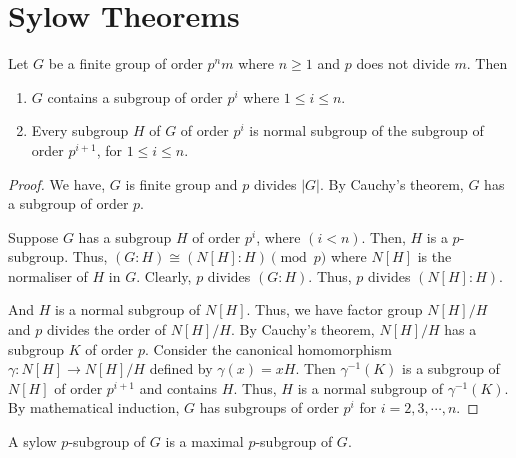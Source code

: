 \section{Sylow Theorems}
\begin{theorem}
	Let $G$ be a finite group of order $p^n m$ where $n \ge 1$ and $p$ does not divide $m$. Then
	\begin{enumerate}
		\item $G$ contains a subgroup of order $p^i$ where $1 \le i \le n$.
		\item Every subgroup $H$ of $G$ of order $p^i$ is normal subgroup of the subgroup of order $p^{i+1}$, for $1 \le i \le n$.
	\end{enumerate}
\end{theorem}
\begin{proof}
	We have, $G$ is finite group and $p$ divides $|G|$.
	By Cauchy's theorem, $G$ has a subgroup of order $p$.

	Suppose $G$ has a subgroup $H$ of order $p^i$, where $(i < n)$.
	Then, $H$ is a $p$-subgroup.
	Thus, $(G:H) \cong (N[H]:H) \pmod{p}$ where $N[H]$ is the normaliser of $H$ in $G$.
	Clearly, $p$ divides $(G:H)$.
	Thus, $p$ divides $(N[H]:H)$.

	And $H$ is a normal subgroup of $N[H]$.
	Thus, we have factor group $N[H]/H$ and $p$ divides the order of $N[H]/H$.
	By Cauchy's theorem, $N[H]/H$ has a subgroup $K$ of order $p$.
	Consider the canonical homomorphism $\gamma : N[H] \to N[H]/H$ defined by $\gamma(x) = xH$.
	Then $\gamma^{-1}(K)$ is a subgroup of $N[H]$ of order $p^{i+1}$ and contains $H$.
	Thus, $H$ is a normal subgroup of $\gamma^{-1}(K)$.
	By mathematical induction, $G$ has subgroups of order $p^i$ for $i = 2,3,\cdots,n$.
\end{proof}

\begin{definition}
	A sylow $p$-subgroup of $G$ is a maximal $p$-subgroup of $G$.
\end{definition}

